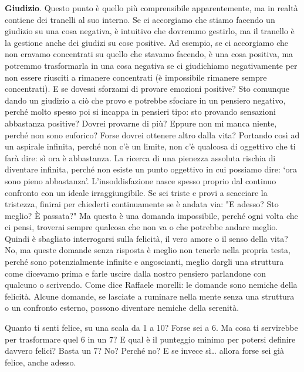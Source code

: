 \documentclass[12pt]{book} %
\begin{document}
\textbf{Giudizio}. Questo punto è quello più comprensibile apparentemente, ma in realtà contiene dei tranelli al suo interno. Se
ci accorgiamo che stiamo facendo un giudizio su una cosa negativa, è intuitivo che dovremmo gestirlo, ma il tranello è
la gestione anche dei giudizi su cose positive. Ad esempio, se ci accorgiamo che non eravamo concentrati su quello che
stavamo facendo, è una cosa positiva, ma potremmo trasformarla in una cosa negativa se ci giudichiamo negativamente per
non essere riusciti a rimanere concentrati (è impossibile rimanere sempre concentrati). E se dovessi sforzami di
provare emozioni positive? Sto comunque dando un giudizio a ciò che provo e potrebbe sfociare in un pensiero negativo,
perché molto spesso poi si incappa in pensieri tipo: sto provando sensazioni abbastanza positive? Dovrei provarne di
più? Eppure non mi manca niente, perché non sono euforico? Forse dovrei ottenere altro dalla vita? Portando così ad un
aspirale infinita, perché non c'è un limite, non c'è qualcosa di oggettivo che ti farà dire: sì ora è abbastanza. 
La ricerca di una pienezza assoluta rischia di diventare infinita, perché non esiste un punto oggettivo in cui possiamo dire: ‘ora sono pieno abbastanza’. L’insoddisfazione nasce spesso proprio dal continuo confronto con un ideale irraggiungibile.
Se sei triste e provi a scacciare la tristezza, finirai per chiederti continuamente se è andata via: "E adesso? Sto meglio? È passata?" Ma questa è una domanda impossibile, perché ogni volta che ci pensi, troverai sempre qualcosa che non va o che potrebbe andare meglio.
Quindi è sbagliato interrogarsi sulla felicità, il vero
amore o il senso della vita? No, ma queste domande senza risposta è meglio non tenerle nella propria testa, perché sono
potenzialmente infinite e angoscianti, meglio dargli una struttura come dicevamo prima e farle uscire dalla nostro
pensiero parlandone con qualcuno o scrivendo. 
Come dice Raffaele morelli: le domande sono nemiche della felicità.
Alcune domande, se lasciate a ruminare nella mente senza una struttura o un confronto esterno, possono diventare nemiche della serenità.

Quanto ti senti felice, su una scala da 1 a 10? Forse sei a 6. Ma cosa ti servirebbe per trasformare quel 6 in un 7?
E qual è il punteggio minimo per potersi definire davvero felici? Basta un 7? No? Perché no?
E se invece sì… allora forse sei già felice, anche adesso.
\end{document}
